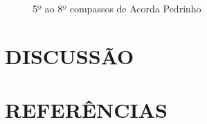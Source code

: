 \documentclass[
  letterpaper,
  DIV=11,
  numbers=noendperiod]{scrreprt}
\begin{document}
\begin{figure}


\caption{\label{fig-compassos}5º ao 8º compassos de Acorda Pedrinho}

\end{figure}%

\chapter{DISCUSSÃO}\label{discussuxe3o}

\chapter*{REFERÊNCIAS}\label{referuxeancias}
\end{document}
